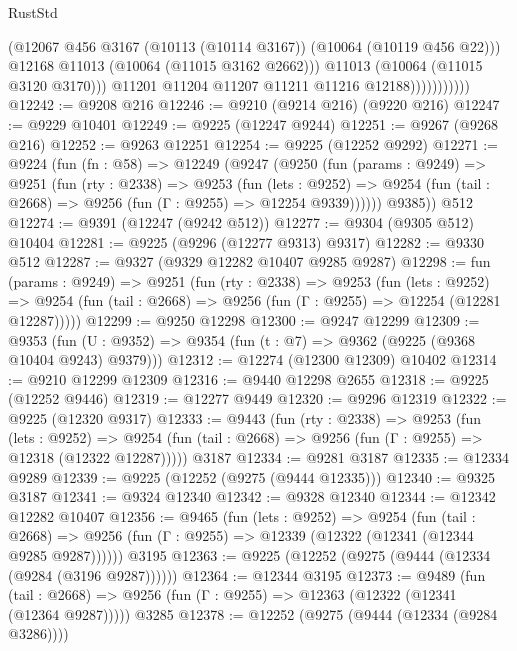 \begin{lexlean}{RustStd}
\begin{coremodule}
                              (@12067 @456 @3167 (@10113 (@10114 @3167)) (@10064 (@10119 @456 @22)))
                              @12168
                              @11013
                              (@10064 (@11015 @3162 @2662)))
                            @11013
                            (@10064 (@11015 @3120 @3170)))
                          @11201
                          @11204
                          @11207
                          @11211
                          @11216
                          @12188)))))))))))
@12242 := @9208 @216
@12246 := @9210 (@9214 @216) (@9220 @216)
@12247 := @9229 @10401
@12249 := @9225 (@12247 @9244)
@12251 := @9267 (@9268 @216)
@12252 := @9263 @12251
@12254 := @9225 (@12252 @9292)
@12271 := @9224
    (fun (fn : @58) =>
    @12249
      (@9247
        (@9250
          (fun (params : @9249) =>
          @9251
            (fun (rty : @2338) =>
            @9253
              (fun (lets : @9252) =>
              @9254 (fun (tail : @2668) => @9256 (fun (Γ : @9255) => @12254 @9339))))))
        @9385))
    @512
@12274 := @9391 (@12247 (@9242 @512))
@12277 := @9304 (@9305 @512) @10404
@12281 := @9225 (@9296 (@12277 @9313) @9317)
@12282 := @9330 @512
@12287 := @9327 (@9329 @12282 @10407 @9285 @9287)
@12298 := fun (params : @9249) =>
  @9251
    (fun (rty : @2338) =>
    @9253
      (fun (lets : @9252) =>
      @9254 (fun (tail : @2668) => @9256 (fun (Γ : @9255) => @12254 (@12281 @12287)))))
@12299 := @9250 @12298
@12300 := @9247 @12299
@12309 := @9353
    (fun (U : @9352) => @9354 (fun (t : @7) => @9362 (@9225 (@9368 @10404 @9243) @9379)))
@12312 := @12274 (@12300 @12309) @10402
@12314 := @9210 @12299 @12309
@12316 := @9440 @12298 @2655
@12318 := @9225 (@12252 @9446)
@12319 := @12277 @9449
@12320 := @9296 @12319
@12322 := @9225 (@12320 @9317)
@12333 := @9443
    (fun (rty : @2338) =>
    @9253
      (fun (lets : @9252) =>
      @9254 (fun (tail : @2668) => @9256 (fun (Γ : @9255) => @12318 (@12322 @12287)))))
    @3187
@12334 := @9281 @3187
@12335 := @12334 @9289
@12339 := @9225 (@12252 (@9275 (@9444 @12335)))
@12340 := @9325 @3187
@12341 := @9324 @12340
@12342 := @9328 @12340
@12344 := @12342 @12282 @10407
@12356 := @9465
    (fun (lets : @9252) =>
    @9254
      (fun (tail : @2668) =>
      @9256 (fun (Γ : @9255) => @12339 (@12322 (@12341 (@12344 @9285 @9287))))))
    @3195
@12363 := @9225 (@12252 (@9275 (@9444 (@12334 (@9284 (@3196 @9287))))))
@12364 := @12344 @3195
@12373 := @9489
    (fun (tail : @2668) => @9256 (fun (Γ : @9255) => @12363 (@12322 (@12341 (@12364 @9287)))))
    @3285
@12378 := @12252 (@9275 (@9444 (@12334 (@9284 @3286))))

\end{coremodule}
\end{lexlean}

